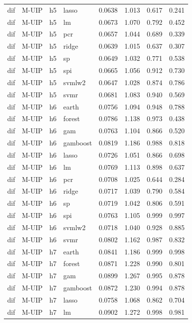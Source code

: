 \begin{ThreePartTable}
\begin{longtable}[t]{llclcccc}
dif & M-UIP & h5 & lasso & 0.0638 & 1.013 & 0.617 & 0.241\\
dif & M-UIP & h5 & lm & 0.0673 & 1.070 & 0.792 & 0.452\\
dif & M-UIP & h5 & pcr & 0.0657 & 1.044 & 0.689 & 0.339\\
dif & M-UIP & h5 & ridge & 0.0639 & 1.015 & 0.637 & 0.307\\
dif & M-UIP & h5 & sp & 0.0649 & 1.032 & 0.771 & 0.538\\
dif & M-UIP & h5 & spi & 0.0665 & 1.056 & 0.912 & 0.730\\
dif & M-UIP & h5 & svmlw2 & 0.0647 & 1.028 & 0.874 & 0.786\\
dif & M-UIP & h5 & svmr & 0.0681 & 1.083 & 0.940 & 0.569\\
\addlinespace
dif & M-UIP & h6 & earth & 0.0756 & 1.094 & 0.948 & 0.788\\
dif & M-UIP & h6 & forest & 0.0786 & 1.138 & 0.973 & 0.438\\
dif & M-UIP & h6 & gam & 0.0763 & 1.104 & 0.866 & 0.520\\
dif & M-UIP & h6 & gamboost & 0.0819 & 1.186 & 0.988 & 0.818\\
dif & M-UIP & h6 & lasso & 0.0726 & 1.051 & 0.866 & 0.698\\
dif & M-UIP & h6 & lm & 0.0769 & 1.113 & 0.898 & 0.637\\
dif & M-UIP & h6 & pcr & 0.0708 & 1.025 & 0.644 & 0.284\\
dif & M-UIP & h6 & ridge & 0.0717 & 1.039 & 0.790 & 0.584\\
dif & M-UIP & h6 & sp & 0.0719 & 1.042 & 0.806 & 0.591\\
dif & M-UIP & h6 & spi & 0.0763 & 1.105 & 0.999 & 0.997\\
dif & M-UIP & h6 & svmlw2 & 0.0718 & 1.040 & 0.928 & 0.885\\
dif & M-UIP & h6 & svmr & 0.0802 & 1.162 & 0.987 & 0.832\\
\addlinespace
dif & M-UIP & h7 & earth & 0.0841 & 1.186 & 0.999 & 0.998\\
dif & M-UIP & h7 & forest & 0.0871 & 1.228 & 0.990 & 0.801\\
dif & M-UIP & h7 & gam & 0.0899 & 1.267 & 0.995 & 0.878\\
dif & M-UIP & h7 & gamboost & 0.0872 & 1.230 & 0.994 & 0.878\\
dif & M-UIP & h7 & lasso & 0.0758 & 1.068 & 0.862 & 0.704\\
dif & M-UIP & h7 & lm & 0.0902 & 1.272 & 0.998 & 0.981\\

\end{longtable}
\end{ThreePartTable}
